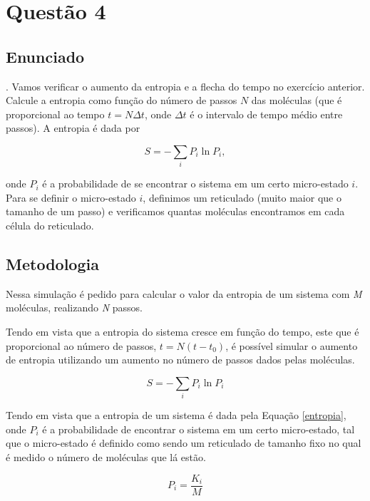 \chapter*{Questão 4}

\section*{Enunciado}

. Vamos verificar o aumento da entropia e a flecha do tempo no exercício anterior. 
Calcule a entropia como função do número de passos $N$ das moléculas (que é proporcional 
ao tempo $t = N \Delta t$, onde $\Delta t$ é o intervalo de tempo médio entre passos). A entropia é dada por

\begin{equation}
S = - \sum_i P_i \ln P_i,
\end{equation}

\noindent
onde $P_i$ é a probabilidade de se encontrar o sistema em um certo micro-estado $i$. 
Para se definir o micro-estado $i$, definimos um reticulado (muito maior que o tamanho 
de um passo) e verificamos quantas moléculas encontramos em cada célula do reticulado.


\section*{Metodologia}

Nessa simulação é pedido para calcular o valor da entropia de um sistema com \textit{M} 
moléculas, realizando \textit{N} passos. 

Tendo em vista que a entropia do sistema cresce em função do tempo, este que é proporcional 
ao número de passos, $t = N(t-t_0)$, é possível simular o aumento de entropia utilizando 
um aumento no número de passos dados pelas moléculas.

\begin{equation} \label{entropia}
    S = -\sum_{i} P_i \ln{P_i}
\end{equation}

Tendo em vista que a entropia de um sistema é dada pela Equação \ref{entropia}, 
onde $P_i$ é a probabilidade de encontrar o sistema em um certo micro-estado, 
tal que o micro-estado é definido como sendo um reticulado de tamanho fixo 
no qual é medido o número de moléculas que lá estão.

\begin{equation} \label{micro-estado}
    P_i = \frac{K_i}{M}
\end{equation}

